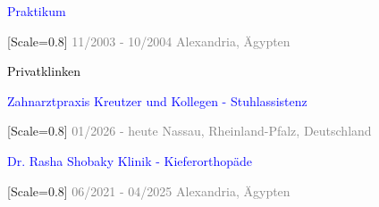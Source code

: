 \vspace{0.7em}



{\setmainfont{Rubik Medium}\fontsize{10}{14}\selectfont\textcolor{blue}{Praktikum}}

{[Scale=0.8]
\textcolor{gray}{
\faCalendar\hspace{4pt}11/2003 - 10/2004\hspace{1.5em}
\faMapMarker*\hspace{4pt}Alexandria, Ägypten
}}\\[-10pt]


\vspace{0.7em}




{\setmainfont{Rubik Medium}\fontsize{10}{14}\selectfont\textcolor{black}{Privatklinken}}




{\setmainfont{Rubik Medium}\fontsize{10}{14}\selectfont\textcolor{blue}{Zahnarztpraxis Kreutzer und Kollegen - Stuhlassistenz}}

{[Scale=0.8]
\textcolor{gray}{
\faCalendar\hspace{4pt}01/2026 - heute\hspace{1.5em}
\faMapMarker*\hspace{4pt}Nassau, Rheinland-Pfalz, Deutschland
}}\\[-10pt]

\vspace{0.7em}

{\setmainfont{Rubik Medium}\fontsize{10}{14}\selectfont\textcolor{blue}{Dr. Rasha Shobaky Klinik - Kieferorthopäde}}

{[Scale=0.8]
\textcolor{gray}{
\faCalendar\hspace{4pt}06/2021 - 04/2025\hspace{1.5em}
\faMapMarker*\hspace{4pt}Alexandria, Ägypten
}}\\[-10pt]



\vspace{0.7em}


